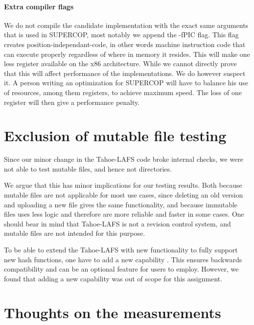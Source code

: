\documentclass[english,12pt,a4paper]{book}
\begin{document}
\paragraph{Extra compiler flags}
We do not compile the candidate implementation with the exact same arguments
that is used in \ac{SUPERCOP}, most notably we append the -fPIC flag. This flag
creates position-independant-code, in other words machine instruction code that
can execute properly regardless of where in memory it resides. This will make
one less register available on the x86 architecture. While we cannot directly
prove that this will affect performance of the implementations. We do however
suspect it. A person writing an optimization for \ac{SUPERCOP} will have to
balance his use of resources, among them registers, to achieve maximum speed.
The loss of one register will then give a performance penalty.  


\section{Exclusion of mutable file testing}

Since our minor change in the Tahoe-\ac{LAFS} code broke internal checks, we
were not able to test mutable files, and hence not directories.

We argue that this has minor implications for our testing results. Both because
mutable files are not applicable for most use cases, since deleting an old
version and uploading a new file gives the same functionality, and because
immutable files uses less logic and therefore are more reliable and faster in
some cases. One should bear in mind that Tahoe-\ac{LAFS} is not a revision
control system, and mutable files are not intended for this purpose.

To be able to extend the Tahoe-LAFS with new functionality to fully support new
hash functions, one have to add a new capability \cite{t_zooko}. This ensures
backwards compatibility and can be an optional feature for users to employ.
However, we found that adding a new capability was out of scope for this
assignment.

\section{Thoughts on the measurements}
\end{document}
